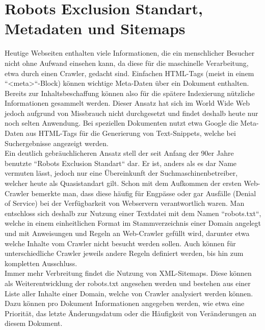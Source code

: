 \section{Robots Exclusion Standart, Metadaten und Sitemaps}
Heutige Webseiten enthalten viele Informationen, die ein menschlicher Besucher nicht ohne Aufwand einsehen kann, da diese für die maschinelle Verarbeitung, etwa durch einen Crawler, gedacht sind. Einfachen HTML-Tags (meist in einem ``<meta>``-Block) können wichtige Meta-Daten über ein Dokument enthalten. Bereits zur Inhaltsbeschaffung können also für die spätere Indexierung nützliche Informationen gesammelt werden. Dieser Ansatz hat sich im World Wide Web jedoch aufgrund von Missbrauch nicht durchgesetzt und findet deshalb heute nur noch selten Anwendung. Bei speziellen Dokumenten nutzt etwa Google die Meta-Daten aus HTML-Tags für die Generierung von Text-Snippets, welche bei Suchergebnisse angezeigt werden. \cite{suchmverst} \cite{htmlmeta}\\
Ein deutlich gebräuchlicheren Ansatz stell der seit Anfang der 90er Jahre benutzte ``Robots Exclusion Standart`` dar. Er ist, anders als es dar Name vermuten lässt, jedoch nur eine Übereinkunft der Suchmaschinenbetreiber, welcher heute als Quasistandart gilt. Schon mit dem Aufkommen der ersten Web-Crawler bemerkte man, dass diese häufig für Engpässe oder gar Ausfälle (Denial of Service) bei der Verfügbarkeit von Webservern verantwortlich waren. Man entschloss sich deshalb zur Nutzung einer Textdatei mit dem Namen ``robots.txt``, welche in einem einheitlichen Format im Stammverzeichnis einer Domain angelegt und mit Anweisungen und Regeln an Web-Crawler gefüllt wird, darunter etwa welche Inhalte vom Crawler nicht besucht werden sollen. Auch können für unterschiedliche Crawler jeweils andere Regeln definiert werden, bis hin zum kompletten Ausschluss. \cite{robotsen} \cite{robotsde} \cite{suchmverst}\\
Immer mehr Verbreitung findet die Nutzung von XML-Sitemaps. Diese können als Weiterentwicklung der robots.txt angesehen werden und bestehen aus einer Liste aller Inhalte einer Domain, welche von Crawler analysiert werden können. Dazu können pro Dokument Informationen angegeben werden, wie etwa eine Priorität, das letzte Änderungsdatum oder die Häufigkeit von Veränderungen an diesem Dokument. \cite{sitemaps}\\
